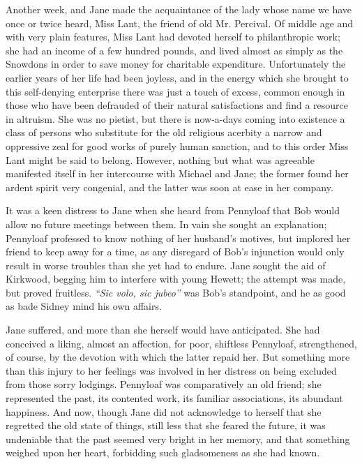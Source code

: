 Another week, and Jane made the acquaintance of the lady whose name we
have once or twice heard, Miss Lant, the friend of old Mr. Percival. Of
middle age and with very plain features, Miss Lant had devoted herself
to philanthropic work; she had an income of a few hundred pounds, and
lived almost as simply as the Snowdons in order to save money for
charitable expenditure. Unfortunately the earlier years of her life had
been joyless, and in the energy which she brought to this self-denying
enterprise there was just a touch of excess, common enough in those who
have been defrauded of their natural satisfactions and find a resource
in altruism. She was no pietist, but there is now-a-days
{\protect\hypertarget{264}{}{}}coming into existence a class of persons
who substitute for the old religious acerbity a narrow and oppressive
zeal for good works of purely human sanction, and to this order Miss
Lant might be said to belong. However, nothing but what was agreeable
manifested itself in her intercourse with Michael and Jane; the former
found her ardent spirit very congenial, and the latter was soon at ease
in her company.

It was a keen distress to Jane when she heard from Pennyloaf that Bob
would allow no future meetings between them. In vain she sought an
explanation; Pennyloaf professed to know nothing of her husband's
motives, but implored her friend to keep away for a time, as any
disregard of Bob's injunction would only result in worse troubles than
she yet had to endure. Jane sought the aid of Kirkwood, begging him to
interfere with young Hewett; the attempt was made, but proved fruitless.
\emph{``Sic volo, sic jubeo''} was Bob's standpoint, and he as good as
bade Sidney mind his own affairs.

{\protect\hypertarget{265}{}{}}Jane suffered, and more than she herself
would have anticipated. She had conceived a liking, almost an affection,
for poor, shiftless Pennyloaf, strengthened, of course, by the devotion
with which the latter repaid her. But something more than this injury to
her feelings was involved in her distress on being excluded from those
sorry lodgings. Pennyloaf was comparatively an old friend; she
represented the past, its contented work, its familiar associations, its
abundant happiness. And now, though Jane did not acknowledge to herself
that she regretted the old state of things, still less that she feared
the future, it was undeniable that the past seemed very bright in her
memory, and that something weighed upon her heart, forbidding such
gladsomeness as she had known.
